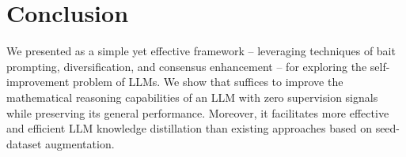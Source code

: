 \section{Conclusion}


We presented {\langname} as a simple yet effective framework -- leveraging techniques of bait prompting, diversification, and consensus enhancement -- for exploring the self-improvement problem of LLMs. We show that {\langname} suffices to improve the mathematical reasoning capabilities of an LLM with zero supervision signals while preserving its general performance. Moreover, it facilitates more effective and efficient LLM knowledge distillation than existing approaches based on seed-dataset augmentation. 